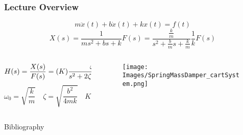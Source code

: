 \documentclass[aspectratio=169,handout]{beamer}
\begin{document}
\begin{frame}
	\frametitle{Lecture Overview}
	\[
		m \ddot{x}(t) + b \dot{x}(t) + k x(t) = f(t)
	\]
	\[
		X(s) = \frac{1}{m s^2 + b s + k} F(s) 
		= \frac{\frac{k}{m}}{s^2 + \frac{b}{m} s + \frac{k}{m}} \frac{1}{k} F(s)
	\]
	\begin{columns}
		\begin{column}{0.5\textwidth}
			\[
				H(s) = \frac{X(s)}{F(s)}%
				= \qty(K)\frac{
					\omega_0^2
				}{
					s^2 + 2 \zeta \omega_0 s + \omega_0^2
				}
			\]		
	\[
		\omega_0 = \sqrt{\frac{k}{m}}
		\quad
		\zeta = \sqrt{\frac{b^2}{4 m k}}
		\quad
		K = \frac{1}{k}
	\]
		\end{column}
		\begin{column}{0.25 \textwidth}
			\begin{figure}[]
				\texttt{[image: Images/SpringMassDamper\_cartSystem.png]}
			\end{figure}
		\end{column}
	\end{columns}
\end{frame}


\begin{frame}{Bibliography}
	
	
\end{frame}
\end{document}
